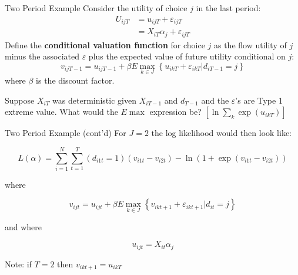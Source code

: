 \documentclass[english,aspectratio=169,12pt,xcolor=dvipsnames]{beamer}
\begin{document}
\begin{frame}{Two Period Example}
    Consider the utility of choice $j$ in the last period:
    \begin{align*}
        U_{ijT}&=u_{ijT}+\varepsilon_{ijT}\\
               &=X_{iT}\alpha_j+\varepsilon_{ijT}
    \end{align*}
    Define the \textbf{conditional valuation function} for choice $j$ as the flow utility of $j$ minus the associated $\varepsilon$ plus the expected value of future utility conditional on $j$:
    \begin{displaymath}
        v_{ijT-1}=u_{ijT-1}+\beta E\max_{k\in J}\left\{u_{ikT}+\varepsilon_{ikT}|d_{iT-1}=j\right\}
    \end{displaymath} 
    where $\beta$ is the discount factor.

    \bigskip
    Suppose $X_{iT}$ was deterministic given $X_{iT-1}$ and $d_{T-1}$ and the $\varepsilon$'s are Type 1 extreme value. What would the $E\max$ expression be? $\left[\ln\sum_{k}\exp\left(u_{ikT}\right)\right]$
\end{frame}




\begin{frame}{Two Period Example (cont'd)}
    For $J=2$ the log likelihood would then look like:

    \begin{displaymath}
        L(\alpha)=\sum_{i=1}^N\sum_{t=1}^T(d_{i1t}=1)(v_{i1t}-v_{i2t})-\ln\left(1+\exp(v_{i1t}-v_{i2t})\right)
    \end{displaymath}

    where 

    \begin{displaymath}
        v_{ijt}=u_{ijt}+\beta E\max_{k\in J}\left\{v_{ikt+1}+\varepsilon_{ikt+1}|d_{it}=j\right\}
    \end{displaymath}

    and where

    \begin{displaymath}
        u_{ijt}=X_{it}\alpha_{j}
    \end{displaymath}

    Note: if $T=2$ then $v_{ikt+1} = u_{ikT}$

\end{frame}
\end{document}
